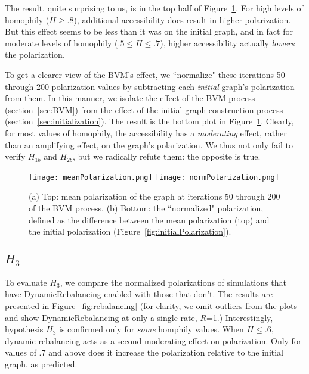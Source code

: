 The result, quite surprising to us, is in the top half of
Figure~\ref{fig:meanNormPolarization}. For high levels of homophily
($H\geq.8$), additional accessibility does result in higher polarization. But
this effect seems to be less than it was on the initial graph, and in fact for
moderate levels of homophily ($.5 \leq H \leq .7$), higher accessibility
actually \textit{lowers} the polarization. 

To get a clearer view of the BVM's effect, we ``normalize" these
iterations-50-through-200 polarization values by subtracting each
\textit{initial} graph's polarization from them. In this manner, we isolate
the effect of the BVM process (section~\ref{sec:BVM}) from the effect of the
initial graph-construction process (section~\ref{sec:initialization}). The
result is the bottom plot in Figure~\ref{fig:meanNormPolarization}. Clearly,
for most values of homophily, the accessibility has a \textit{moderating}
effect, rather than an amplifying effect, on the graph's polarization. We thus
not only fail to verify $H_{1b}$ and $H_{2b}$, but we radically refute them:
the opposite is true.

\begin{figure}
\centering
\texttt{[image: meanPolarization.png]}
\texttt{[image: normPolarization.png]}

\caption{(a) Top: mean polarization of the graph at iterations 50 through 200
of the BVM process. (b) Bottom: the ``normalized" polarization, defined as the
difference between the mean polarization (top) and the initial polarization
(Figure~\ref{fig:initialPolarization}).}
\label{fig:meanNormPolarization}
\end{figure}

\subsection{$H_{3}$}

To evaluate $H_3$, we compare the normalized polarizations of simulations that
have DynamicRebalancing enabled with those that don't. The results are presented
in Figure~\ref{fig:rebalancing} (for clarity, we omit outliers from the plots
and show DynamicRebalancing at only a single rate, $R$=1.) Interestingly,
hypothesis $H_3$ is confirmed only for \textit{some} homphily values. When
$H\leq.6$, dynamic rebalancing acts as a second moderating effect on
polarization. Only for values of .7 and above does it increase the
polarization relative to the initial graph, as predicted. 

